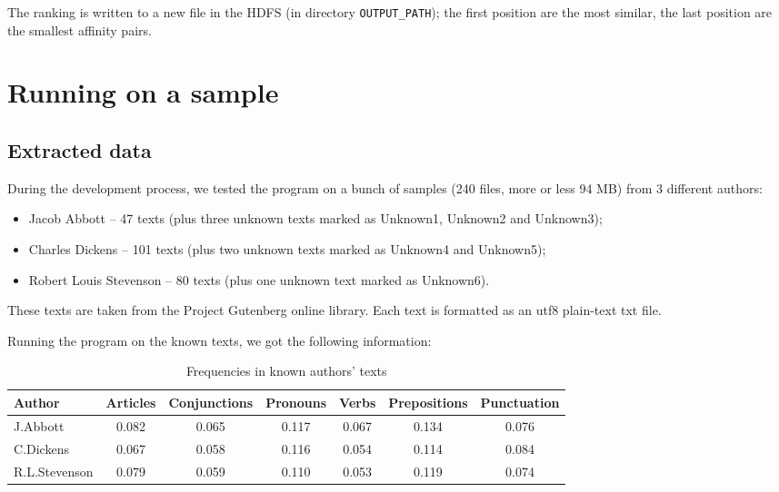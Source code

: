 \documentclass[a4paper,11pt, twoside]{article}
\begin{document}
	\noindent
	The ranking is written to a new file in the HDFS (in directory \lstinline|OUTPUT_PATH|); the first position are the most similar, the last position are the smallest affinity pairs.

	\newpage
	\section{Running on a sample}\label{sample}
	\subsection{Extracted data}
	During the development process, we tested the program on a bunch of samples (240 files, more or less 94 MB) from 3 different authors: 
	\begin{itemize}
		\item Jacob Abbott -- 47 texts (plus three unknown texts marked as Unknown1, Unknown2 and Unknown3);
		\item Charles Dickens -- 101 texts (plus two unknown texts marked as Unknown4 and Unknown5);
		\item Robert Louis Stevenson -- 80 texts (plus one unknown text marked as Unknown6).
	\end{itemize}

		\noindent
		These texts are taken from the Project Gutenberg online library. Each text is formatted as an utf8 plain-text txt file.

		\bigskip

		\noindent
		Running the program on the known texts, we got the following information:
		\begin{table}[h!]
			\small
			\begin{tabular}{lcccccc}
				\toprule
				Author   & Articles    & Conjunctions & Pronouns & Verbs & Prepositions & Punctuation \\
				\midrule
				J.Abbott      & 0.082  & 0.065 & 0.117 & 0.067 & 0.134 & 0.076  \\
				C.Dickens     & 0.067  & 0.058 & 0.116 & 0.054 & 0.114 & 0.084  \\
				R.L.Stevenson & 0.079  & 0.059 & 0.110 & 0.053 & 0.119 & 0.074  \\
				\bottomrule
			\end{tabular}
			\caption{Frequencies in known authors' texts}
			\label{tab:known-freq}
		\end{table}
		\bigskip
\end{document}
